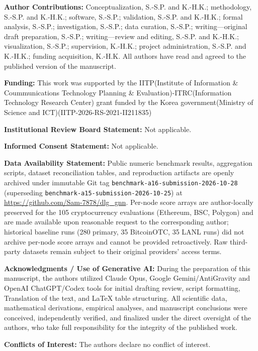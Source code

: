 \documentclass[11pt,a4paper]{article}
\newcommand{\authorcontributions}[1]{\par\medskip\noindent\textbf{Author Contributions: }#1}
\newcommand{\funding}[1]{\par\smallskip\noindent\textbf{Funding: }#1}
\newcommand{\institutionalreview}[1]{\par\smallskip\noindent\textbf{Institutional Review Board Statement: }#1}
\newcommand{\informedconsent}[1]{\par\smallskip\noindent\textbf{Informed Consent Statement: }#1}
\newcommand{\dataavailability}[1]{\par\smallskip\noindent\textbf{Data Availability Statement: }#1}
\newcommand{\conflictsofinterest}[1]{\par\smallskip\noindent\textbf{Conflicts of Interest: }#1}
\begin{document}
\vspace{6pt}

\authorcontributions{Conceptualization, S.-S.P. and K.-H.K.; methodology, S.-S.P. and K.-H.K.; software, S.-S.P.; validation, S.-S.P. and K.-H.K.; formal analysis, S.-S.P.; investigation, S.-S.P.; data curation, S.-S.P.; writing---original draft preparation, S.-S.P.; writing---review and editing, S.-S.P. and K.-H.K.; visualization, S.-S.P.; supervision, K.-H.K.; project administration, S.-S.P. and K.-H.K.; funding acquisition, K.-H.K. All authors have read and agreed to the published version of the manuscript.}

\funding{This work was supported by the IITP(Institute of Information \& Coummunications Technology Planning \& Evaluation)-ITRC(Information Technology Research Center) grant funded by the Korea government(Ministry of Science and ICT)(IITP-2026-RS-2021-II211835)}

\institutionalreview{Not applicable.}

\informedconsent{Not applicable.}

\dataavailability{Public numeric benchmark results, aggregation scripts, dataset reconciliation tables, and reproduction artifacts are openly archived under immutable Git tag \texttt{benchmark-a16-submission-2026-10-28} (superseding \texttt{benchmark-a15-submission-2026-10-25}) at \url{https://github.com/Sam-7878/dlg_gnn}. Per-node score arrays are author-locally preserved for the 105 cryptocurrency evaluations (Ethereum, BSC, Polygon) and are made available upon reasonable request to the corresponding author; historical baseline runs (280 primary, 35 BitcoinOTC, 35 LANL runs) did not archive per-node score arrays and cannot be provided retroactively. Raw third-party datasets remain subject to their original providers' access terms.}

\par\smallskip\noindent\textbf{Acknowledgments / Use of Generative AI: }During the preparation of this manuscript, the authors utilized Claude Opus, Google Gemini/AntiGravity and OpenAI ChatGPT/Codex tools for initial drafting review, script formatting, Translation of the text, and LaTeX table structuring. All scientific data, mathematical derivations, empirical analyses, and manuscript conclusions were conceived, independently verified, and finalized under the direct oversight of the authors, who take full responsibility for the integrity of the published work.

\conflictsofinterest{The authors declare no conflict of interest.}
\end{document}
